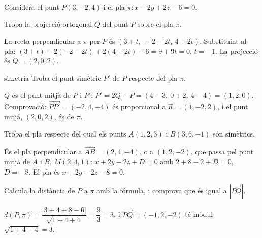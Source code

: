 Considera el punt $P(3,-2,4)$ i el pla $\pi\colon x-2y+2z-6=0$.

\begin{apartats}

Troba la projecció ortogonal $Q$ del punt $P$ sobre el pla $\pi$.

\begin{solucio}
La recta perpendicular a $\pi$ per $P$ és $(3+t,\ -2-2t,\ 4+2t)$. Substituint al pla:
$(3+t)-2(-2-2t)+2(4+2t)-6=9+9t=0$, $t=-1$. La projecció és $Q=(2,0,2)$.
\end{solucio}

\begin{tria}{simetria}
Troba el punt simètric $P'$ de $P$ respecte del pla $\pi$.

\begin{solucio}
$Q$ és el punt mitjà de $P$ i $P'$: $P'=2Q-P=(4-3,\ 0+2,\ 4-4)=(1,2,0)$.\\
Comprovació: $\overrightarrow{PP'}=(-2,4,-4)$ és proporcional a $\vec n=(1,-2,2)$, i el punt mitjà,
$(2,0,2)$, és de $\pi$.
\end{solucio}

Troba el pla respecte del qual els punts $A(1,2,3)$ i $B(3,6,-1)$ són simètrics.

\begin{solucio}
És el pla perpendicular a $\overrightarrow{AB}=(2,4,-4)$, o a $(1,2,-2)$, que passa pel punt mitjà de
$A$ i $B$, $M(2,4,1)$: $x+2y-2z+D=0$ amb $2+8-2+D=0$, $D=-8$. El pla és $x+2y-2z-8=0$.
\end{solucio}
\end{tria}

\begin{nomesllarg}
Calcula la distància de $P$ a $\pi$ amb la fórmula, i comprova que és igual a $|\overrightarrow{PQ}|$.

\begin{solucio}
$d(P,\pi)=\dfrac{|3+4+8-6|}{\sqrt{1+4+4}}=\dfrac93=3$, i $\overrightarrow{PQ}=(-1,2,-2)$ té mòdul
$\sqrt{1+4+4}=3$.
\end{solucio}
\end{nomesllarg}

\end{apartats}
